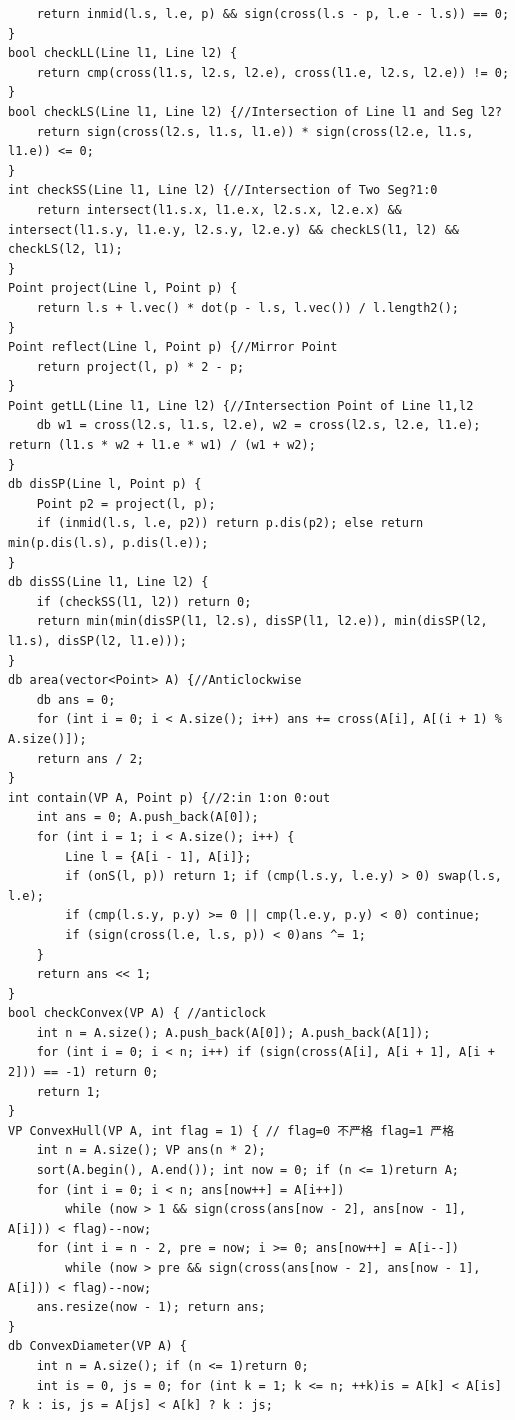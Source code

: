 \documentclass[twoside]{article}
\begin{document}
\begin{lstlisting}
    return inmid(l.s, l.e, p) && sign(cross(l.s - p, l.e - l.s)) == 0;
}
bool checkLL(Line l1, Line l2) {
    return cmp(cross(l1.s, l2.s, l2.e), cross(l1.e, l2.s, l2.e)) != 0;
}
bool checkLS(Line l1, Line l2) {//Intersection of Line l1 and Seg l2?
    return sign(cross(l2.s, l1.s, l1.e)) * sign(cross(l2.e, l1.s, l1.e)) <= 0;
}
int checkSS(Line l1, Line l2) {//Intersection of Two Seg?1:0
    return intersect(l1.s.x, l1.e.x, l2.s.x, l2.e.x) && intersect(l1.s.y, l1.e.y, l2.s.y, l2.e.y) && checkLS(l1, l2) && checkLS(l2, l1);
}
Point project(Line l, Point p) {
    return l.s + l.vec() * dot(p - l.s, l.vec()) / l.length2();
}
Point reflect(Line l, Point p) {//Mirror Point
    return project(l, p) * 2 - p;
}
Point getLL(Line l1, Line l2) {//Intersection Point of Line l1,l2
    db w1 = cross(l2.s, l1.s, l2.e), w2 = cross(l2.s, l2.e, l1.e); return (l1.s * w2 + l1.e * w1) / (w1 + w2);
}
db disSP(Line l, Point p) {
    Point p2 = project(l, p);
    if (inmid(l.s, l.e, p2)) return p.dis(p2); else return min(p.dis(l.s), p.dis(l.e));
}
db disSS(Line l1, Line l2) {
    if (checkSS(l1, l2)) return 0;
    return min(min(disSP(l1, l2.s), disSP(l1, l2.e)), min(disSP(l2, l1.s), disSP(l2, l1.e)));
}
db area(vector<Point> A) {//Anticlockwise
    db ans = 0;
    for (int i = 0; i < A.size(); i++) ans += cross(A[i], A[(i + 1) % A.size()]);
    return ans / 2;
}
int contain(VP A, Point p) {//2:in 1:on 0:out
    int ans = 0; A.push_back(A[0]);
    for (int i = 1; i < A.size(); i++) {
        Line l = {A[i - 1], A[i]};
        if (onS(l, p)) return 1; if (cmp(l.s.y, l.e.y) > 0) swap(l.s, l.e);
        if (cmp(l.s.y, p.y) >= 0 || cmp(l.e.y, p.y) < 0) continue;
        if (sign(cross(l.e, l.s, p)) < 0)ans ^= 1;
    }
    return ans << 1;
}
bool checkConvex(VP A) { //anticlock
    int n = A.size(); A.push_back(A[0]); A.push_back(A[1]);
    for (int i = 0; i < n; i++) if (sign(cross(A[i], A[i + 1], A[i + 2])) == -1) return 0;
    return 1;
}
VP ConvexHull(VP A, int flag = 1) { // flag=0 不严格 flag=1 严格
    int n = A.size(); VP ans(n * 2);
    sort(A.begin(), A.end()); int now = 0; if (n <= 1)return A;
    for (int i = 0; i < n; ans[now++] = A[i++])
        while (now > 1 && sign(cross(ans[now - 2], ans[now - 1], A[i])) < flag)--now;
    for (int i = n - 2, pre = now; i >= 0; ans[now++] = A[i--])
        while (now > pre && sign(cross(ans[now - 2], ans[now - 1], A[i])) < flag)--now;
    ans.resize(now - 1); return ans;
}
db ConvexDiameter(VP A) {
    int n = A.size(); if (n <= 1)return 0;
    int is = 0, js = 0; for (int k = 1; k <= n; ++k)is = A[k] < A[is] ? k : is, js = A[js] < A[k] ? k : js;

\end{lstlisting}
\end{document}

